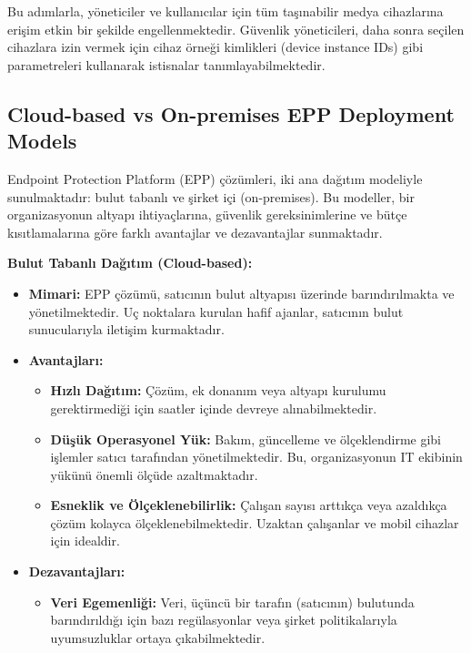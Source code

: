 Bu adımlarla, yöneticiler ve kullanıcılar için tüm taşınabilir medya cihazlarına erişim etkin bir şekilde engellenmektedir. Güvenlik yöneticileri, daha sonra seçilen cihazlara izin vermek için cihaz örneği kimlikleri (device instance IDs) gibi parametreleri kullanarak istisnalar tanımlayabilmektedir.

\subsection{Cloud-based vs On-premises EPP Deployment Models}

Endpoint Protection Platform (EPP) çözümleri, iki ana dağıtım modeliyle sunulmaktadır: bulut tabanlı ve şirket içi (on-premises). Bu modeller, bir organizasyonun altyapı ihtiyaçlarına, güvenlik gereksinimlerine ve bütçe kısıtlamalarına göre farklı avantajlar ve dezavantajlar sunmaktadır.

\textbf{Bulut Tabanlı Dağıtım (Cloud-based):}
\begin{itemize}
    \item \textbf{Mimari:} EPP çözümü, satıcının bulut altyapısı üzerinde barındırılmakta ve yönetilmektedir. Uç noktalara kurulan hafif ajanlar, satıcının bulut sunucularıyla iletişim kurmaktadır.
    \item \textbf{Avantajları:}
    \begin{itemize}
        \item \textbf{Hızlı Dağıtım:} Çözüm, ek donanım veya altyapı kurulumu gerektirmediği için saatler içinde devreye alınabilmektedir.
        \item \textbf{Düşük Operasyonel Yük:} Bakım, güncelleme ve ölçeklendirme gibi işlemler satıcı tarafından yönetilmektedir. Bu, organizasyonun IT ekibinin yükünü önemli ölçüde azaltmaktadır.
        \item \textbf{Esneklik ve Ölçeklenebilirlik:} Çalışan sayısı arttıkça veya azaldıkça çözüm kolayca ölçeklenebilmektedir. Uzaktan çalışanlar ve mobil cihazlar için idealdir.
    \end{itemize}
    \item \textbf{Dezavantajları:}
    \begin{itemize}
        \item \textbf{Veri Egemenliği:} Veri, üçüncü bir tarafın (satıcının) bulutunda barındırıldığı için bazı regülasyonlar veya şirket politikalarıyla uyumsuzluklar ortaya çıkabilmektedir.
    \end{itemize}
\end{itemize}

